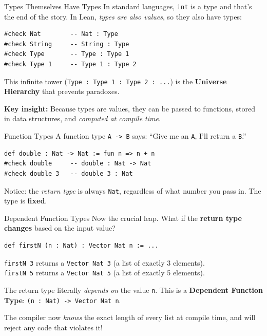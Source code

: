 \documentclass[10pt,aspectratio=169]{beamer}
\begin{document}
\begin{frame}[fragile]{Types Themselves Have Types}
    In standard languages, \verb|int| is a type and that's the end of the story. In Lean, \textit{types are also values}, so they also have types:
    
    \begin{lstlisting}[language={}]
#check Nat        -- Nat : Type
#check String     -- String : Type
#check Type       -- Type : Type 1
#check Type 1     -- Type 1 : Type 2
    \end{lstlisting}
    
    This infinite tower (\verb|Type : Type 1 : Type 2 : ...|) is the \textbf{Universe Hierarchy} that prevents paradoxes.
    
    \vspace{0.5em}
    \textbf{Key insight:} Because types are values, they can be passed to functions, stored in data structures, and \textit{computed at compile time}.
\end{frame}

\begin{frame}[fragile]{Function Types}
    A function type \verb|A -> B| says: ``Give me an \verb|A|, I'll return a \verb|B|.''
    
    \begin{lstlisting}[language={}]
def double : Nat -> Nat := fun n => n + n
#check double     -- double : Nat -> Nat
#check double 3   -- double 3 : Nat
    \end{lstlisting}
    
    Notice: the \textit{return type} is always \verb|Nat|, regardless of what number you pass in. The type is \textbf{fixed}.
\end{frame}

\begin{frame}[fragile]{Dependent Function Types}
    Now the crucial leap. What if the \textbf{return type changes} based on the input value?
    
    \begin{lstlisting}[language={}]
def firstN (n : Nat) : Vector Nat n := ...
    \end{lstlisting}
    
    \verb|firstN 3| returns a \verb|Vector Nat 3| (a list of exactly 3 elements).\\
    \verb|firstN 5| returns a \verb|Vector Nat 5| (a list of exactly 5 elements).
    
    \vspace{0.5em}
    The return type literally \textit{depends on} the value \verb|n|. This is a \textbf{Dependent Function Type}: \verb|(n : Nat) -> Vector Nat n|.
    
    \vspace{0.5em}
    The compiler now \textit{knows} the exact length of every list at compile time, and will reject any code that violates it!
\end{frame}
\end{document}
